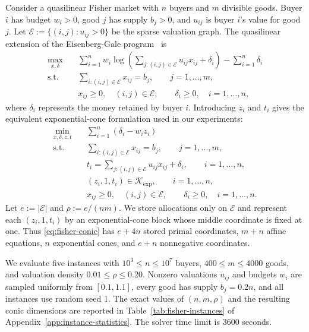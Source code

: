 \documentclass[letterpaper]{article} %
\theoremstyle{definition}
\theoremstyle{remark}
\begin{document}
Consider a quasilinear Fisher market with $n$ buyers and $m$ divisible goods.
Buyer $i$ has budget $w_i>0$, good $j$ has supply $b_j>0$, and $u_{ij}$ is
buyer $i$'s value for good $j$. Let
$\mathcal E:=\{(i,j):u_{ij}>0\}$ be the sparse valuation graph. The quasilinear
extension of the Eisenberg-Gale program~\cite{gao2023infinite} is
\begin{equation}
\label{eq:fisher-qleg}
\begin{aligned}
    \max_{x,\delta}\quad
        & \sum_{i=1}^n w_i
          \log\!\left(\sum_{j:(i,j)\in\mathcal E}u_{ij}x_{ij}+\delta_i\right)
          -\sum_{i=1}^n\delta_i\\
    \mathrm{s.t.}\quad
        & \sum_{i:(i,j)\in\mathcal E}x_{ij}=b_j,
          \qquad j=1,\ldots,m,\\
        & x_{ij}\ge0,\quad (i,j)\in\mathcal E,
          \qquad \delta_i\ge0,\quad i=1,\ldots,n,
\end{aligned}
\end{equation}
where $\delta_i$ represents the money retained by buyer $i$. Introducing
$z_i$ and $t_i$ gives the equivalent exponential-cone formulation used in
our experiments:
\begin{equation}
\label{eq:fisher-conic}
\begin{aligned}
    \min_{x,\delta,z,t}\quad
        & \sum_{i=1}^n(\delta_i-w_i z_i)\\
    \mathrm{s.t.}\quad
        & \sum_{i:(i,j)\in\mathcal E}x_{ij}=b_j,
          \qquad j=1,\ldots,m,\\
        & t_i=\sum_{j:(i,j)\in\mathcal E}u_{ij}x_{ij}+\delta_i,
          \qquad i=1,\ldots,n,\\
        & (z_i,1,t_i)\in\mathcal K_{\mathrm{exp}},
          \qquad i=1,\ldots,n,\\
        & x_{ij}\ge0,\quad (i,j)\in\mathcal E,
          \qquad \delta_i\ge0,\quad i=1,\ldots,n.
\end{aligned}
\end{equation}
Let $e:=|\mathcal E|$ and $\rho:=e/(nm)$.  We store allocations only on
$\mathcal E$ and represent each $(z_i,1,t_i)$ by an exponential-cone block
whose middle coordinate is fixed at one.  Thus \eqref{eq:fisher-conic} has
$e+4n$ stored primal coordinates, $m+n$ affine equations, $n$ exponential
cones, and $e+n$ nonnegative coordinates.

We evaluate five instances with $10^3\le n\le10^7$ buyers, $400\le m\le4000$
goods, and valuation density $0.01\le\rho\le0.20$. Nonzero valuations
$u_{ij}$ and budgets $w_i$ are sampled uniformly from $[0.1,1.1]$, every
good has supply $b_j=0.2n$, and all instances use random seed 1. The exact
values of $(n,m,\rho)$ and the resulting conic dimensions are reported in
Table~\ref{tab:fisher-instances} of Appendix~\ref{app:instance-statistics}.
The solver time limit is 3600 seconds.
\end{document}
